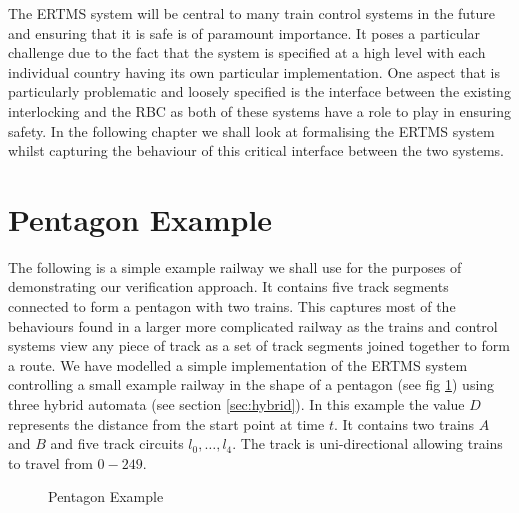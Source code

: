 

\label{chap:hybrid}
The ERTMS system will be central to many train control systems in the future and ensuring that it is safe is of paramount importance. It poses a particular challenge due to the fact that the system is specified at a high level with each individual country having its own particular implementation. One aspect that is particularly problematic and loosely specified is the interface between the existing interlocking and the RBC as both of these systems have a role to play in ensuring safety. In the following chapter we shall look at formalising the ERTMS system whilst capturing the behaviour of this critical interface between the two systems. 

\section{Pentagon Example}

The following is a simple example railway we shall use for the purposes of demonstrating our verification approach.  It contains five track segments connected to form a pentagon with two trains. This captures most of the behaviours found in a larger more complicated railway as the trains and control systems view any piece of track as a set of track segments joined together to form a route. We have modelled  a simple implementation of the ERTMS system controlling  a small example railway in the shape of a pentagon (see fig \ref{fig:pentagon2}) using three hybrid automata (see section \ref{sec:hybrid}). In this example the value $D$ represents the distance from the start point at time $t$. It contains two trains $A$ and $B$ and five track circuits $l_0, \ldots , l_4$. The track is uni-directional allowing trains to travel from $0 - 249$. 
\medskip

\begin{figure} [h!]

\begin{center}
\end{center}

 \caption{Pentagon Example}
 \label{fig:pentagon2}
\end{figure}

